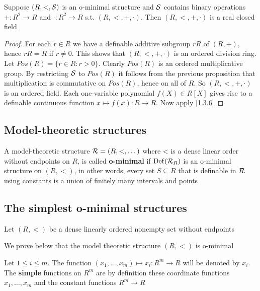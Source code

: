 \documentclass[11pt]{article}
\begin{document}
\begin{proposition}[]
Suppose \((R,<,\mathcal{S})\) is an o-minimal structure and \(\mathcal{S}\) contains binary operations \(+:R^2\to R\)
and \(\cdot:R^2\to R\) s.t. \((R,<,​+,\cdot)\). Then \((R,<, ​+,\cdot)\) is a real closed field
\end{proposition}

\begin{proof}
For each \(r\in R\) we have a definable additive subgroup \(rR\) of \((R,+)\), hence \(rR=R\)
if \(r\neq 0\). This shows that \((R,<,+,\cdot)\) is an ordered division ring.
Let \(Pos(R)=\{r\in R:r>0\}\). Clearly \(Pos(R)\) is an ordered multiplicative group. By
restricting \(\mathcal{S}\) to \(Pos(R)\) it follows from the previous proposition that multiplication is
commutative on \(Pos(R)\), hence on all of \(R\). So \((R,<,+,\cdot)\) is an ordered field. Each
one-variable polynomial \(f(X)\in R[X]\) gives rise to a definable continuous
function \(x\mapsto f(x):R\to R\). Now apply \ref{1.3.6}
\end{proof}
\subsection{Model-theoretic structures}
\label{sec:orgade8675}
\begin{definition}[]
A model-theoretic structure \(\mathcal{R}=(R,<,\dots)\) where < is a dense linear order without endpoints
on \(R\), is called \textbf{o-minimal} if \(\operatorname{Def}(\mathcal{R}_R)\) is an o-minimal structure on \((R,<)\), in other
words, every set \(S\subseteq R\) that is definable in \(\mathcal{R}\) using constants is a union of finitely many
intervals and points
\end{definition}
\subsection{The simplest o-minimal structures}
\label{sec:orgfc2369a}
Let \((R,<)\) be a dense linearly ordered nonempty set without endpoints

We prove below that the model theoretic structure \((R,<)\) is o-minimal

Let \(1\le i\le m\). The function \((x_1,\dots,x_m)\mapsto x_i:R^m\to R\) will be denoted by \(x_i\). The \textbf{simple}
functions on \(R^m\) are by definition these coordinate functions \(x_1,\dots,x_m\) and the constant
functions \(R^m\to R\)
\end{document}
